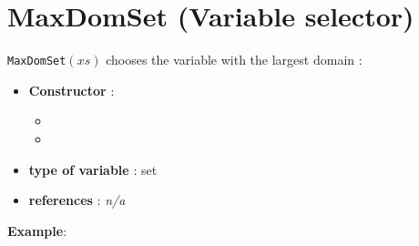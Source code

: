 \section{MaxDomSet (Variable selector)}\label{maxdomset:maxdomsetvarselector}\hypertarget{maxdomset:maxdomsetvarselector}{}
\begin{notedef}
  \texttt{MaxDomSet}$(xs)$ chooses the variable with the largest domain :
\end{notedef}

\begin{itemize}
	\item \textbf{Constructor} : 
	\begin{itemize}
	\item {}
	\item {}
	\end{itemize}	
	\item \textbf{type of variable} : set
	\item \textbf{references} : \emph{n/a}
\end{itemize}

\textbf{Example}:
%

